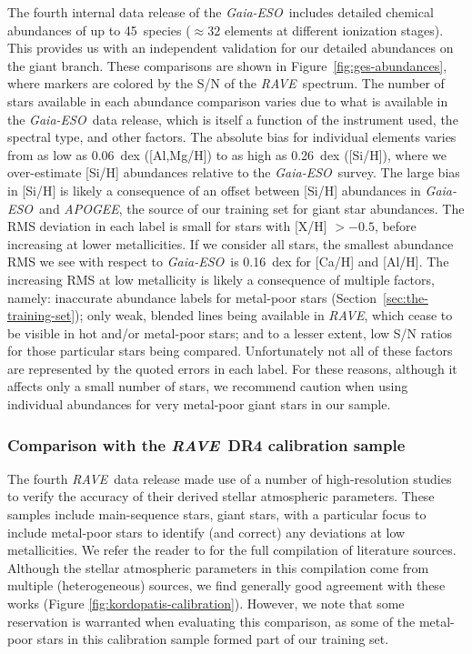 \documentclass[preprint]{aastex}
\newcommand{\acronym}[1]{{\small{#1}}}
\newcommand{\project}[1]{\textsl{#1}}
\newcommand{\rave}{\project{\acronym{RAVE}}}
\newcommand{\ges}{\project{Gaia-ESO}}
\newcommand{\apogee}{\project{\acronym{APOGEE}}}
\begin{document}
The fourth internal data release of the \ges\ includes detailed chemical
abundances of up to 45~species ($\approx32$ elements at different ionization
stages).  This provides us with an independent validation for our detailed
abundances on the giant branch.  These comparisons are shown in 
Figure~\ref{fig:ges-abundances}, where markers are colored by the
S/N of the \rave\ spectrum.  The number of stars available in each abundance
comparison varies due to what is available in the \ges\ data release, which
is itself a function of the instrument used, the spectral type, and other
factors.  The absolute bias for individual elements varies from as low as
0.06~dex ([Al,Mg/H]) to as high as 0.26~dex ([Si/H]), where we over-estimate 
[Si/H] abundances relative to the \ges\ survey.  The large bias in [Si/H]
is likely a consequence of an offset between [Si/H] abundances in \ges\ and
\apogee, the source of our training set for giant star abundances.  
The RMS deviation in each label is small for stars with [X/H] $> -0.5$, 
before increasing at lower metallicities.  If we consider all stars, the 
smallest abundance RMS we see with respect to \ges\ is 0.16~dex for [Ca/H] 
and [Al/H].  The increasing RMS at low metallicity is likely a consequence
of multiple factors, namely: inaccurate abundance labels for metal-poor stars
(Section~\ref{sec:the-training-set}); only weak, blended lines being available
in \rave, which cease to be visible in hot and/or metal-poor stars; and to a 
lesser extent, low S/N ratios for those particular stars being compared.  
Unfortunately not all of these factors are represented by the quoted errors 
in each label.  For these reasons, although it affects only a small number of
stars, we recommend caution when using individual abundances for very 
metal-poor giant stars in our sample.


\subsubsection{Comparison with the \rave\ DR4 calibration sample}
\label{sec:dr4-calibration-sample}


The fourth \rave\ data release made use of a number of high-resolution studies
to verify the accuracy of their derived stellar atmospheric parameters.  These
samples include main-sequence stars, giant stars, with a particular focus to
include metal-poor stars to identify (and correct) any deviations at low
metallicities.  We refer the reader to \citet{Kordopatis_2013} for the full 
compilation of literature sources.  Although the stellar atmospheric parameters
in this compilation come from multiple (heterogeneous) sources, we find 
generally good agreement with these works 
(Figure \ref{fig:kordopatis-calibration}).  However, we note that some 
reservation is warranted when evaluating this comparison, as some of the 
metal-poor stars in this calibration sample formed part of our training set.  
\end{document}
